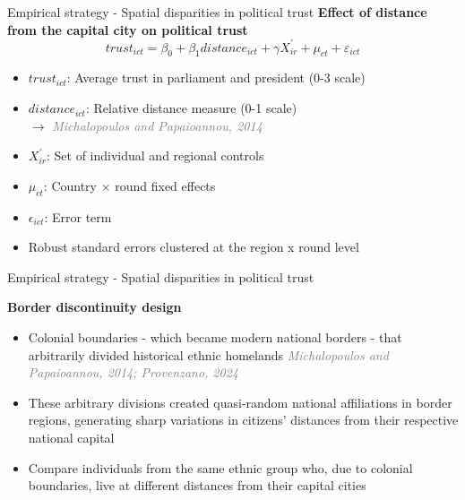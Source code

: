 \documentclass[10pt]{beamer}
\begin{document}
\begin{frame}{Empirical strategy - Spatial disparities in political trust}
    \centering \textbf{Effect of distance from the capital city on political trust}\vspace{1em}
        \begin{equation}
        trust_{ict} = \beta_{0} + \beta_{1}distance_{ict} + \gamma X^{'}_{ir} + \mu_{ct} + \varepsilon_{ict}
        \end{equation}
        \begin{itemize}
            \item $trust_{ict}$: Average trust in parliament and president (0-3 scale)\vfill
            \item $distance_{ict}$: Relative distance measure (0-1 scale)\\
            \vspace{0.1cm}
            $\rightarrow{}$ \textcolor{gray}{\textit{Michalopoulos and Papaioannou, 2014}}\vfill
            \item $X^{'}_{ir}$: Set of individual and regional controls\vfill
            \item $\mu_{ct}$: Country $\times$ round fixed effects\vfill
            \item $\epsilon_{ict}$: Error term\vfill
            \item Robust standard errors clustered at the region x round level
        \end{itemize}
\end{frame}

\begin{frame}{Empirical strategy - Spatial disparities in political trust}

    \centering \textcolor{rougeprez}{\textbf{Border discontinuity design}} \vfill
    \begin{itemize}\setlength\itemsep{1em}
            \item Colonial boundaries - which became modern national borders
            - that arbitrarily divided historical ethnic homelands  \textcolor{gray}{\textit{Michalopoulos and Papaioannou, 2014; Provenzano, 2024}}\vfill
            \item These arbitrary divisions created
            quasi-random national affiliations in border regions, generating sharp variations in citizens’
            distances from their respective national capital \vfill
            \item Compare individuals from the same ethnic group who, due to colonial boundaries, live at different distances
            from their capital cities \vfill
        \end{itemize}
\end{frame}
\end{document}
